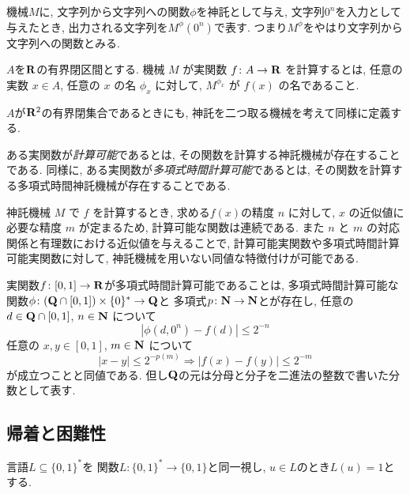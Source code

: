 機械$M$に, 
文字列から文字列への関数$\phi$を神託として与え, 
文字列$0 ^n$を入力として与えたとき, 
出力される文字列を$M ^\phi (0 ^n)$で表す. 
つまり$M ^\phi$をやはり文字列から文字列への関数とみる. 

\begin{definition}
$A$を$\mathbf R$の有界閉区間とする. 
機械 $M$ が実関数 $f \colon A \to \mathbf R$ を計算するとは,
任意の実数 $x \in A$, 任意の $x$ の名 $\phi_x$ に対して,
$M^{\phi_x}$ が $f(x)$ の名であること.
\end{definition}

$A$が$\mathbf R ^2$の有界閉集合であるときにも, 
神託を二つ取る機械を考えて同様に定義する. 

 ある実関数が\emph{計算可能}であるとは, その関数を計算する神託機械が存在することである.
 同様に, ある実関数が\emph{多項式時間計算可能}であるとは, その関数を計算する多項式時間神託機械が存在することである.

 神託機械 $M$ で $f$ を計算するとき, 求める$f (x)$の精度 $n$ に対して,
 $x$ の近似値に必要な精度 $m$ が定まるため,
 計算可能な関数は連続である.
 また $n$ と $m$ の対応関係と有理数における近似値を与えることで,
 計算可能実関数や多項式時間計算可能実関数に対して,
 神託機械を用いない同値な特徴付けが可能である.

\begin{lemma}
  \label{lem:type1representation}
  実関数$f\colon [0,1] \to \mathbf R$が多項式時間計算可能であることは, 
  多項式時間計算可能な
  関数$\phi \colon (\mathbf Q \cap [0, 1]) \times \{0\} ^* \to \mathbf Q$と
  多項式$p \colon \mathbf N \to \mathbf N$とが存在し, 
  任意の $d \in \mathbf Q \cap [0,1]$, $n \in \mathbf N$ について
  \begin{equation}
   |\phi(d, 0^n) - f(d)| \le 2^{-n} 
  \end{equation}
  任意の $x, y \in [0, 1]$, $m \in \mathbf N$ について
  \begin{equation}
   |x-y| \le 2^{-p(m)} \Rightarrow |f(x) - f(y)| \le 2^{-m} 
  \end{equation}
  が成立つことと同値である. 
但し$\mathbf Q$の元は分母と分子を二進法の整数で書いた分数として表す. 
\end{lemma}

\subsection{帰着と困難性}
言語$L \subseteq \{0, 1\} ^*$を
関数$L \colon \{0, 1\} ^* \to \{0, 1\}$と同一視し, 
$u \in L$のとき$L (u) = 1$とする. 

